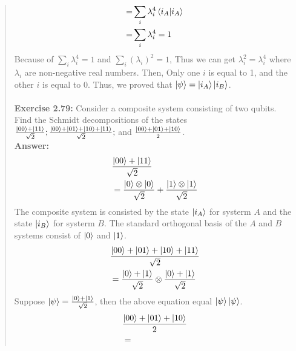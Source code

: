 \documentclass[UTF8]{ctexart}
\begin{document}
\begin{quote}
\begin{equation}
\begin{aligned}
						  =&\sum_{i}\lambda_{i}^{4}\bra{i_{A}}\ket{i_{A}} \\
						  =&\sum_{i}\lambda_{i}^{4}=1 \\
	\end{aligned}
\end{equation}
Because of $\sum_{i}\lambda_{i}^{4}=1$ and  $\sum_{i}(\lambda_{i})^{2}=1$, Thus we can get $\lambda_{i}^{2}=\lambda_{i}^{4}$ where $\lambda_{i}$ are non-negative real numbers.
Then, Only one $i$ is equal to 1, and the other $i$ is equal to 0.
Thus, we proved that $\ket{\psi}=\ket{i_{A}}\ket{i_{B}}$.
	\\
\\
\textbf{Exercise 2.79: } Consider a composite system consisting of two qubits.
 Find the Schmidt decompositions of the states\\
$\frac{\ket{00}+\ket{11}}{\sqrt{2}};\frac{\ket{00}+\ket{01}+\ket{10}+\ket{11}}{\sqrt{2}};$
and $\frac{\ket{00}+\ket{01}+\ket{10}}{2}$.
\\
\textbf{Answer:}\\
\begin{equation}
	\begin{aligned}
		&\frac{\ket{00}+\ket{11}}{\sqrt{2}}\\
		&=\frac{\ket{0}\otimes\ket{0}}{\sqrt{2}}+\frac{\ket{1}\otimes\ket{1}}{\sqrt{2}}\\
	\end{aligned}
\end{equation}
The composite system is consisted by the state $\ket{i_{A}} $ for systerm $A$  and the state $\ket{i_{B}} $ for systerm $B$.
The standard orthogonal basis of the $A$ and $B$ systems consist of $\ket{0}$ and $\ket{1}$.
\\
\begin{equation}
	\begin{aligned}
		&\frac{\ket{00}+\ket{01}+\ket{10}+\ket{11}}{\sqrt{2}} \\
		&=\frac{\ket{0}+\ket{1}}{\sqrt{2}}\otimes\frac{\ket{0}+\ket{1}}{\sqrt{2}} \\
	\end{aligned}
\end{equation}
Suppose $\ket{\psi}=\frac{\ket{0}+\ket{1}}{\sqrt{2}}$, then the above equation equal $\ket{\psi}\ket{\psi}$. 
\\
\begin{equation}
	\begin{aligned}
		&\frac{\ket{00}+\ket{01}+\ket{10}}{2} \\
		&=
	\end{aligned}

\end{equation}
\end{quote}
\end{document}
